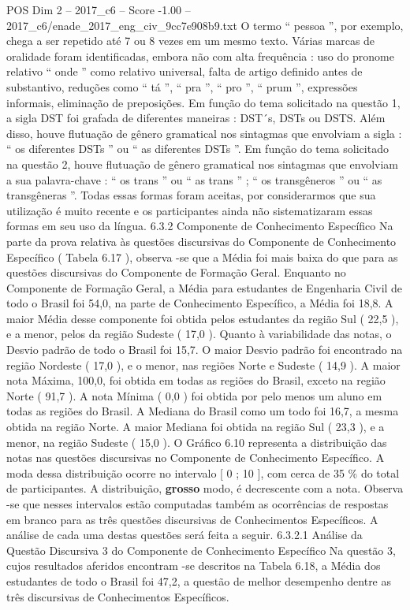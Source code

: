 \begin{textsample}{POS Dim 2 – 2017\_c6 – Score -1.00 – 2017\_c6/enade\_2017\_eng\_civ\_9cc7e908b9.txt}
O termo “ pessoa ”, por exemplo, chega a ser repetido até 7 ou 8 vezes em um mesmo texto.
Várias marcas de oralidade foram identificadas, embora não com alta frequência : uso do pronome relativo “ onde ” como relativo universal, falta de artigo definido antes de substantivo, reduções como “ tá ”, “ pra ”, “ pro ”, “ prum ”, expressões informais, eliminação de preposições.
Em função do tema solicitado na questão 1, a sigla DST foi grafada de diferentes maneiras : DST´s, DSTs ou DSTS.
Além disso, houve flutuação de gênero gramatical nos sintagmas que envolviam a sigla : “ os diferentes DSTs ” ou “ as diferentes DSTs ”.
Em função do tema solicitado na questão 2, houve flutuação de gênero gramatical nos sintagmas que envolviam a sua palavra-chave : “ os trans ” ou “ as trans ” ; “ os transgêneros ” ou “ as transgêneras ”.
Todas essas formas foram aceitas, por considerarmos que sua utilização é muito recente e os participantes ainda não sistematizaram essas formas em seu uso da língua. 6.3.2 Componente de Conhecimento Específico Na parte da prova relativa às questões discursivas do Componente de Conhecimento Específico ( Tabela 6.17 ), observa -se que a Média foi mais baixa do que para as questões discursivas do Componente de Formação Geral.
Enquanto no Componente de Formação Geral, a Média para estudantes de Engenharia Civil de todo o Brasil foi 54,0, na parte de Conhecimento Específico, a Média foi 18,8.
A maior Média desse componente foi obtida pelos estudantes da região Sul ( 22,5 ), e a menor, pelos da região Sudeste ( 17,0 ).
Quanto à variabilidade das notas, o Desvio padrão de todo o Brasil foi 15,7.
O maior Desvio padrão foi encontrado na região Nordeste ( 17,0 ), e o menor, nas regiões Norte e Sudeste ( 14,9 ).
A maior nota Máxima, 100,0, foi obtida em todas as regiões do Brasil, exceto na região Norte ( 91,7 ).
A nota Mínima ( 0,0 ) foi obtida por pelo menos um aluno em todas as regiões do Brasil.
A Mediana do Brasil como um todo foi 16,7, a mesma obtida na região Norte.
A maior Mediana foi obtida na região Sul ( 23,3 ), e a menor, na região Sudeste ( 15,0 ).
O Gráfico 6.10 representa a distribuição das notas nas questões discursivas no Componente de Conhecimento Específico.
A moda dessa distribuição ocorre no intervalo [ 0 ; 10 ], com cerca de 35 \% do total de participantes.
A distribuição, \textbf{grosso} modo, é decrescente com a nota.
Observa -se que nesses intervalos estão computadas também as ocorrências de respostas em branco para as três questões discursivas de Conhecimentos Específicos.
A análise de cada uma destas questões será feita a seguir. 6.3.2.1 Análise da Questão Discursiva 3 do Componente de Conhecimento Específico Na questão 3, cujos resultados aferidos encontram -se descritos na Tabela 6.18, a Média dos estudantes de todo o Brasil foi 47,2, a questão de melhor desempenho dentre as três discursivas de Conhecimentos Específicos.

\end{textsample}
